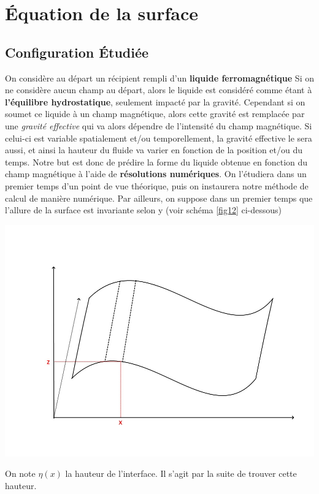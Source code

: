 \documentclass[10pt,a4paper]{article}
\begin{document}
\section{Équation de la surface}
\subsection{Configuration Étudiée}
On considère au départ un récipient rempli d'un \textbf{liquide ferromagnétique} Si on ne considère aucun champ au départ, alors le liquide est considéré comme étant à \textbf{l'équilibre hydrostatique}, seulement impacté par la gravité. Cependant si on soumet ce liquide à un champ magnétique, alors cette gravité est remplacée par une \textit{gravité effective} qui va alors dépendre de l'intensité du champ magnétique. Si celui-ci est variable spatialement et/ou temporellement, la gravité effective le sera aussi, et ainsi la hauteur du fluide va varier en fonction de la position et/ou du temps. 
\newline
\newline
Notre but est donc de prédire la forme du liquide obtenue en fonction du champ magnétique à l'aide de \textbf{résolutions numériques}. On l'étudiera dans un premier temps d'un point de vue théorique, puis on instaurera notre méthode de calcul de manière numérique.
\newline
\newline
Par ailleurs, on suppose dans un premier temps que l'allure de la surface est invariante selon y (voir schéma \ref{fig12} ci-dessous)
\begin{center}
\includegraphics[scale=0.4]{images/IMG_4598.jpg} 
\label{fig12}
\end{center}
On note $\eta (x)$ la hauteur de l'interface. Il s'agit par la suite de trouver cette hauteur.
\end{document}
